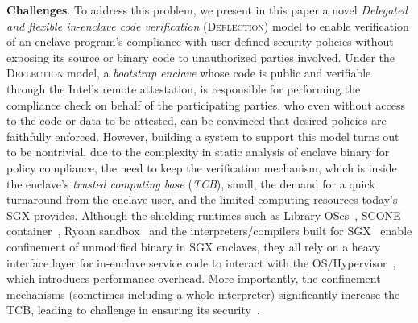 \vspace{3pt}\noindent\textbf{Challenges}. To address this problem, we present in this paper a novel \textit{Delegated and flexible in-enclave code verification} (\textsc{Deflection}) model to enable verification of an enclave program's compliance with user-defined security policies without exposing its source or binary code to unauthorized parties involved. Under the \textsc{Deflection} model, a \textit{bootstrap enclave} whose code is public and verifiable through the Intel's remote attestation, is responsible for performing the compliance check on behalf of the participating parties, who even without access to the code or data to be attested, can be convinced that desired policies are faithfully enforced.  
However, building a system to support this model turns out to be nontrivial, due to the complexity in static analysis of enclave binary for policy compliance, the need to keep the verification mechanism, which is inside the enclave's \textit{trusted computing base} (\textit{TCB}), small, the demand for a quick turnaround from the enclave user, and the limited computing resources today's SGX provides\DIFdelbegin {}\DIFdelend . 
Although the shielding runtimes such as Library OSes~\cite{priebe2019sgx,shen2020occlum},  SCONE container~\cite{arnautov2016scone}, Ryoan sandbox~\cite{hunt2018ryoan} and the interpreters/compilers built for SGX~\cite{wang2019towards,wang2019running} enable confinement of unmodified binary in SGX  enclaves, they all rely on a heavy interface layer for in-enclave service code to interact with the OS/Hypervisor~\cite{lazard2018teeshift}, which introduces performance overhead. More importantly, the confinement mechanisms (sometimes including a whole interpreter) significantly increase the TCB, leading to \DIFdelbegin {}\DIFdelend \DIFaddbegin {}\DIFaddend challenge in ensuring its security~\cite{van2019tale}.
\DIFdelbegin {}%


